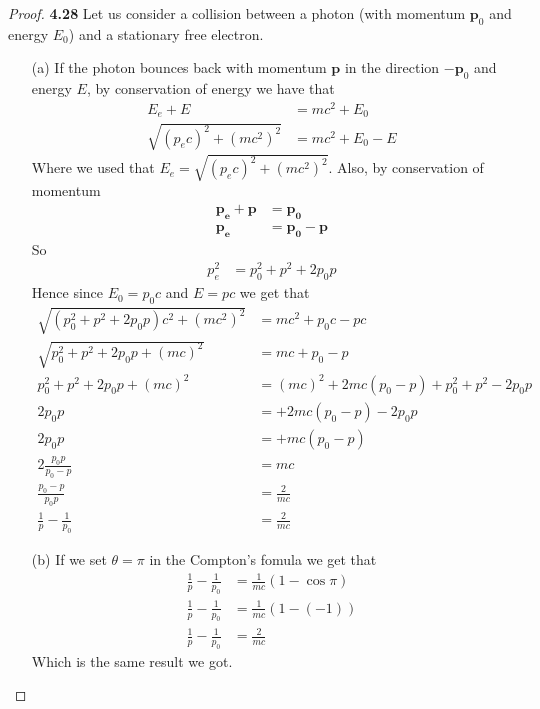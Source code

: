 \documentclass[11pt]{article}
\theoremstyle{definition}
\begin{document}
\cleardoublepage
\begin{proof}{\textbf{4.28}}
    Let us consider a collision between a photon (with momentum $\bm p_0$ and 
    energy $E_0$) and a stationary free electron.
    \begin{itemize}
    \item [(a)] If the photon bounces back with momentum $\bm{p}$ in
    the direction $-\bm p_0$ and energy $E$, by conservation of energy
    we have that
    \begin{align*}
        E_e + E  &= mc^2 + E_0\\
        \sqrt{(p_ec)^2 + (mc^2)^2} &= mc^2 + E_0 - E 
    \end{align*}
    Where we used that $E_e = \sqrt{(p_ec)^2 + (mc^2)^2}$. Also, by conservation of
    momentum
    \begin{align*}
        \bm{p_e} + \bm{p} &= \bm{p_0}\\
        \bm{p_e} &= \bm{p_0} - \bm{p}        
    \end{align*}
    So
    \begin{align*}
        p_e^2 &= p_0^2 + p^2 + 2p_0p        
    \end{align*}
    Hence since $E_0 = p_0c$ and $E = pc$ we get that
    \begin{align*}
        \sqrt{(p_0^2 + p^2 + 2p_0p)c^2 + (mc^2)^2} &= mc^2 + p_0c - pc \\
        \sqrt{p_0^2 + p^2 + 2p_0p + (mc)^2} &= mc + p_0 - p \\
        p_0^2 + p^2 + 2p_0p + (mc)^2 &= (mc)^2 + 2mc(p_0 - p) + p_0^2 + p^2 - 2p_0p\\
        2p_0p  &= + 2mc(p_0 - p) - 2p_0p\\
        2p_0p  &= + mc(p_0 - p)\\
        2\frac{p_0p}{p_0 - p} &= mc\\
        \frac{p_0 - p}{p_0 p} &= \frac{2}{mc}\\
        \frac{1}{p} - \frac{1}{p_0} &= \frac{2}{mc}
    \end{align*}

    \item [(b)] If we set $\theta = \pi$ in the Compton's fomula we get that
    \begin{align*}
        \frac{1}{p} - \frac{1}{p_0} &= \frac{1}{mc}(1 - \cos\pi)\\
        \frac{1}{p} - \frac{1}{p_0} &= \frac{1}{mc}(1 - (-1))\\
        \frac{1}{p} - \frac{1}{p_0} &= \frac{2}{mc}        
    \end{align*}
    Which is the same result we got.        
    \end{itemize}
\end{proof}
\end{document}
